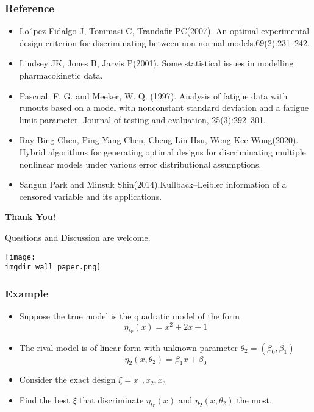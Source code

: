 \documentclass[xcolor=dvipsnames,aspectratio=1610]{beamer}
\begin{document}
\begin{frame}
\frametitle{Reference}
\begin{itemize}
\item Lo´pez-Fidalgo J, Tommasi C, Trandafir PC(2007). An optimal experimental design criterion for discriminating
between non-normal models.69(2):231–242.

\item Lindsey JK, Jones B, Jarvis P(2001). Some statistical issues in modelling pharmacokinetic data.

\item Pascual, F. G. and Meeker, W. Q. (1997). Analysis of fatigue data with runouts based on a model with nonconstant standard deviation and a fatigue limit parameter. Journal of testing and evaluation, 25(3):292–301.

\item Ray-Bing Chen, Ping-Yang Chen, Cheng-Lin Hsu, Weng Kee Wong(2020). Hybrid algorithms for generating optimal designs for discriminating multiple nonlinear models under various error distributional assumptions.

\item Sangun Park and Minsuk Shin(2014).Kullback–Leibler information of a censored variable and its applications.

\end{itemize}
\end{frame}



\begin{frame}[plain]
\centering
\vfill
{\Huge \textbf{Thank You!} \par}
{\large Questions and Discussion are welcome. \par}
\texttt{[image: \\imgdir wall\_paper.png]}
\vfill
\end{frame}




\begin{frame}
\frametitle{Example}

\begin{itemize}
\item Suppose the true model is the quadratic model of the form
$$\eta_{tr}(x)=x^2+2x+1$$
\item The rival model is of linear form with unknown parameter $\theta_2=(\beta_0,\beta_1)$
$$\eta_2(x,\theta_2)=\beta_1x+\beta_0$$
\item Consider the exact design $\xi={x_1,x_2,x_3}$
\item Find the best $\xi$ that discriminate $\eta_{tr}(x)$ and $\eta_2(x,\theta_2)$  the most.
\end{itemize}

\end{frame}
\end{document}
